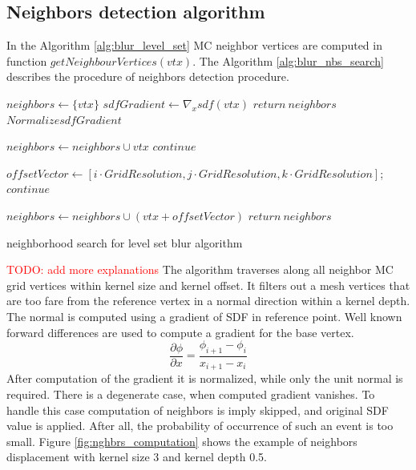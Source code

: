 \subsection{Neighbors detection algorithm}
In the Algorithm \ref{alg:blur_level_set} MC neighbor vertices are computed in function $getNeighbourVertices(vtx)$. The Algorithm \ref{alg:blur_nbs_search} describes the procedure of neighbors detection procedure.
\begin{algorithm}[H]
	\scriptsize
	\begin{algorithmic}
		\State $neighbors \gets \{vtx\}$
		\State $sdfGradient \gets \nabla_x sdf(vtx)$
			\State $return\ neighbors$
		\EndIf
		\State $Normalize sdfGradient$
		
						\State $neighbors \gets neighbors \cup vtx$
						\State $continue$
					\EndIf
					
					\State $offsetVector \gets [i \cdot GridResolution, j \cdot GridResolution, k \cdot GridResolution]$;
						\State $continue$
					\EndIf
					
					\State $neighbors \gets neighbors \cup (vtx + offsetVector)$
				\EndFor
			\EndFor
		\EndFor
		\State $return\ neighbors$
	\end{algorithmic}
	\caption{neighborhood search for level set blur algorithm}
	\label{alg:blur_nbs_search}
\end{algorithm}
\textcolor{red}{TODO: add more explanations}
The algorithm traverses along all neighbor MC grid vertices within kernel size and kernel offset. It filters out a mesh vertices that are too fare from the reference vertex in a normal direction within a kernel depth. The normal is computed using a gradient of SDF in reference point. Well known forward differences are used to compute a gradient for the base vertex.
\begin{equation}
	\dfrac{\partial \phi}{\partial x} = \dfrac{\phi_{i+1} - \phi_i}{x_{i+1} - x_i}
\end{equation}
After computation of the gradient it is normalized, while only the unit normal is required. There is a degenerate case, when computed gradient vanishes. To handle this case computation of neighbors is imply skipped, and original SDF value is applied. After all, the probability of occurrence of such an event is too small. Figure \ref{fig:nghbrs_computation} shows the example of neighbors displacement with kernel size 3 and kernel depth 0.5.
